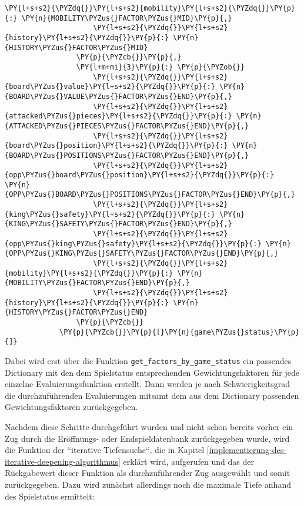 \begin{Verbatim}[commandchars=\\\{\}]
                     \PY{l+s+s2}{\PYZdq{}}\PY{l+s+s2}{mobility}\PY{l+s+s2}{\PYZdq{}}\PY{p}{:} \PY{n}{MOBILITY\PYZus{}FACTOR\PYZus{}MID}\PY{p}{,}
                     \PY{l+s+s2}{\PYZdq{}}\PY{l+s+s2}{history}\PY{l+s+s2}{\PYZdq{}}\PY{p}{:} \PY{n}{HISTORY\PYZus{}FACTOR\PYZus{}MID}
                 \PY{p}{\PYZcb{}}\PY{p}{,}
                 \PY{l+m+mi}{3}\PY{p}{:} \PY{p}{\PYZob{}}
                     \PY{l+s+s2}{\PYZdq{}}\PY{l+s+s2}{board\PYZus{}value}\PY{l+s+s2}{\PYZdq{}}\PY{p}{:} \PY{n}{BOARD\PYZus{}VALUE\PYZus{}FACTOR\PYZus{}END}\PY{p}{,}
                     \PY{l+s+s2}{\PYZdq{}}\PY{l+s+s2}{attacked\PYZus{}pieces}\PY{l+s+s2}{\PYZdq{}}\PY{p}{:} \PY{n}{ATTACKED\PYZus{}PIECES\PYZus{}FACTOR\PYZus{}END}\PY{p}{,}
                     \PY{l+s+s2}{\PYZdq{}}\PY{l+s+s2}{board\PYZus{}position}\PY{l+s+s2}{\PYZdq{}}\PY{p}{:} \PY{n}{BOARD\PYZus{}POSITIONS\PYZus{}FACTOR\PYZus{}END}\PY{p}{,}
                     \PY{l+s+s2}{\PYZdq{}}\PY{l+s+s2}{opp\PYZus{}board\PYZus{}position}\PY{l+s+s2}{\PYZdq{}}\PY{p}{:} \PY{n}{OPP\PYZus{}BOARD\PYZus{}POSITIONS\PYZus{}FACTOR\PYZus{}END}\PY{p}{,}
                     \PY{l+s+s2}{\PYZdq{}}\PY{l+s+s2}{king\PYZus{}safety}\PY{l+s+s2}{\PYZdq{}}\PY{p}{:} \PY{n}{KING\PYZus{}SAFETY\PYZus{}FACTOR\PYZus{}END}\PY{p}{,}
                     \PY{l+s+s2}{\PYZdq{}}\PY{l+s+s2}{opp\PYZus{}king\PYZus{}safety}\PY{l+s+s2}{\PYZdq{}}\PY{p}{:} \PY{n}{OPP\PYZus{}KING\PYZus{}SAFETY\PYZus{}FACTOR\PYZus{}END}\PY{p}{,}
                     \PY{l+s+s2}{\PYZdq{}}\PY{l+s+s2}{mobility}\PY{l+s+s2}{\PYZdq{}}\PY{p}{:} \PY{n}{MOBILITY\PYZus{}FACTOR\PYZus{}END}\PY{p}{,}
                     \PY{l+s+s2}{\PYZdq{}}\PY{l+s+s2}{history}\PY{l+s+s2}{\PYZdq{}}\PY{p}{:} \PY{n}{HISTORY\PYZus{}FACTOR\PYZus{}END}
                 \PY{p}{\PYZcb{}}
             \PY{p}{\PYZcb{}}\PY{p}{[}\PY{n}{game\PYZus{}status}\PY{p}{]}
\end{Verbatim}

    Dabei wird erst über die Funktion
\texttt{get\_factors\_by\_game\_status} ein passendes Dictionary mit den
dem Spielstatus entsprechenden Gewichtungsfaktoren für jede einzelne
Evaluierungsfunktion erstellt. Dann werden je nach Schwierigkeitsgrad
die durchzuführenden Evaluierungen mitsamt dem aus dem Dictionary
passenden Gewichtungsfaktoren zurückgegeben.

Nachdem diese Schritte durchgeführt wurden und nicht schon bereits
vorher ein Zug durch die Eröffnungs- oder Endspieldatenbank
zurückgegeben wurde, wird die Funktion der ``iterative Tiefensuche``, die in
Kapitel \ref{implementierung-des-iterative-deepening-algorithmus} erklärt wird, aufgerufen und das der Rückgabewert dieser
Funktion als durchzuführender Zug ausgewählt und somit zurückgegeben.
Dazu wird zunächst allerdings noch die maximale Tiefe anhand des
Spielstatus ermittelt:

